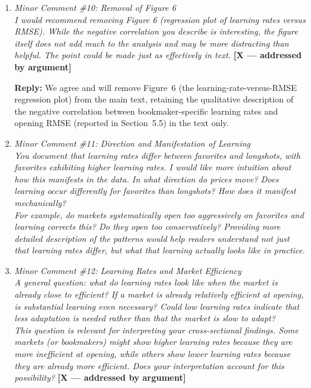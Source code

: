 \documentclass[letterpaper,12pt]{article}
\newcounter{b}
\newcommand{\argX}{\textcolor{green!55!black}{\textbf{[X --- addressed by argument]}}}
\newcommand{\Reply}[1]{\par\noindent\textbf{Reply:} #1}
\begin{document}
\begin{enumerate}
\item \textit{Minor Comment \#10: Removal of Figure 6\\[6pt]
I would recommend removing Figure 6 (regression plot of learning rates versus RMSE). While the negative correlation you describe is interesting, the figure itself does not add much to the analysis and may be more distracting than helpful. The point could be made just as effectively in text.} \argX

\Reply{We agree and will remove Figure~6 (the learning-rate-versus-RMSE regression plot) from the main text, retaining the qualitative description of the negative correlation between bookmaker-specific learning rates and opening RMSE (reported in Section~5.5) in the text only.}

\item \textit{Minor Comment \#11: Direction and Manifestation of Learning\\[6pt]
You document that learning rates differ between favorites and longshots, with favorites exhibiting higher learning rates. I would like more intuition about how this manifests in the data. In what direction do prices move? Does learning occur differently for favorites than longshots? How does it manifest mechanically?\\[6pt]
For example, do markets systematically open too aggressively on favorites and learning corrects this? Do they open too conservatively? Providing more detailed description of the patterns would help readers understand not just that learning rates differ, but what that learning actually looks like in practice.}

\item \textit{Minor Comment \#12: Learning Rates and Market Efficiency\\[6pt]
A general question: what do learning rates look like when the market is already close to efficient? If a market is already relatively efficient at opening, is substantial learning even necessary? Could low learning rates indicate that less adaptation is needed rather than that the market is slow to adapt?\\[6pt]
This question is relevant for interpreting your cross-sectional findings. Some markets (or bookmakers) might show higher learning rates because they are more inefficient at opening, while others show lower learning rates because they are already more efficient. Does your interpretation account for this possibility?} \argX


\end{enumerate}
\end{document}

